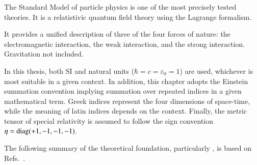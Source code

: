 The Standard Model of particle physics is one of the most precisely tested
theories. It is a relatistivic quantum field theory using the Lagrange
formalism.

It provides a unified description of three of the four forces of nature: the
electromagnetic interaction, the weak interaction, and the strong
interaction. Gravitation not included.

In this thesis, both SI and natural units ($\hbar = c = \varepsilon_0 = 1$) are
used, whichever is most suitable in a given context. In addition, this chapter
adopts the Einstein summation convention implying summation over repeated
indices in a given mathematical term. Greek indices represent the four
dimensions of space-time, while the meaning of latin indices depends on the
context. Finally, the metric tensor of special relativity is assumed to follow
the sign convention $\eta = \operatorname{diag}(+1, -1, -1, -1)$.

The following summary of the theoretical foundation, particularly
, is based on
Refs.~\cite{Halzen:1984mc,Thomson:2013zua,Djouadi:2005gi}.


